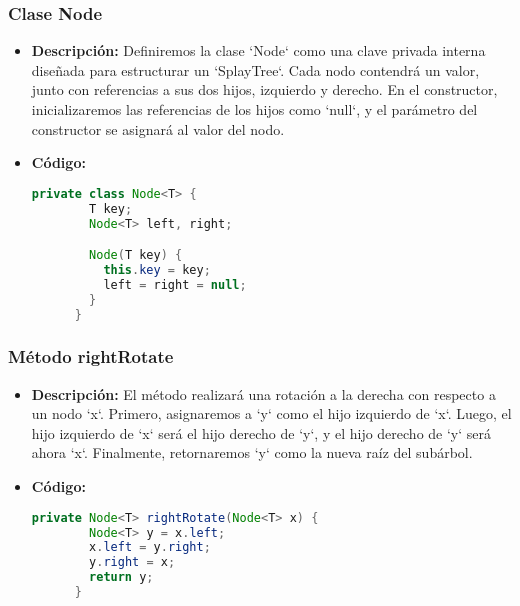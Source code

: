 \documentclass{article}
\begin{document}
  \subsubsection{Clase Node}
  \begin{itemize}
    \item \textbf{Descripción: }Definiremos la clase `Node` como una clave privada interna diseñada para estructurar un `SplayTree`. Cada nodo contendrá un valor, 
    junto con referencias a sus dos hijos, izquierdo y derecho. En el constructor, inicializaremos las referencias de los hijos como 
    `null`, y el parámetro del constructor se asignará al valor del nodo.
    \item \textbf{Código: }
    \begin{lstlisting}[language=Java, caption={Clase Node}]
      private class Node<T> {
        T key;
        Node<T> left, right;

        Node(T key) {
          this.key = key;
          left = right = null;
        }
      }
    \end{lstlisting}
  \end{itemize}
  

  \subsubsection{Método rightRotate}
  \begin{itemize}
    \item \textbf{Descripción: }El método realizará una rotación a la derecha con respecto a un nodo `x`. Primero, asignaremos a 
    `y` como el hijo izquierdo de `x`. Luego, el hijo izquierdo de `x` será el hijo derecho de `y`, y el hijo derecho de `y` 
    será ahora `x`. Finalmente, retornaremos `y` como la nueva raíz del subárbol.
    \item \textbf{Código: }
    \begin{lstlisting}[language=Java, caption={Método rightRotate}]
      private Node<T> rightRotate(Node<T> x) {
        Node<T> y = x.left;
        x.left = y.right;
        y.right = x;
        return y;
      }
    \end{lstlisting}
  \end{itemize}
  
\end{document}
